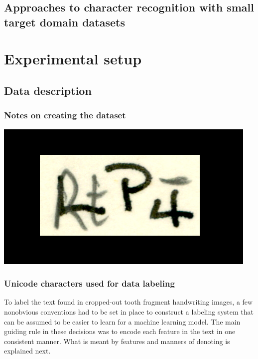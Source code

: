 \documentclass{article}
\begin{document}
\subsection{Approaches to character recognition with small target domain datasets}

\section{Experimental setup}

\subsection{Data description}

\subsubsection{Notes on creating the dataset}

\includegraphics*[scale=0.2]{../images/superambiguous_data_sample.png}

\subsubsection{Unicode characters used for data labeling}

To label the text found in cropped-out tooth fragment handwriting images, a few nonobvious 
conventions had to be set in place to construct a labeling system that can be assumed to 
be easier to learn for a machine learning model. The main guiding rule in these decisions was 
to encode each feature in the text in one consistent manner. What is meant by features and manners 
of denoting is explained next.
\end{document}
